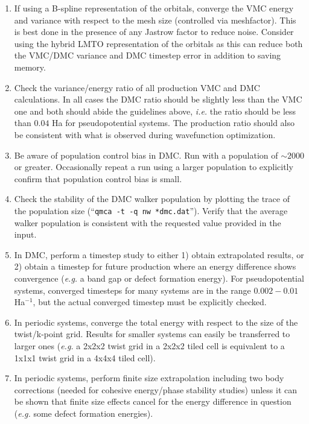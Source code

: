 \begin{enumerate}
  \item{If using a B-spline representation of the orbitals, converge 
    the VMC energy and variance with respect to the mesh size (controlled 
    via meshfactor).  This is best done in the presence of any 
    Jastrow factor to reduce noise.  Consider using the hybrid LMTO 
    representation of the orbitals as this can reduce both the VMC/DMC 
    variance and DMC timestep error in addition to saving memory.}

  \item{Check the variance/energy ratio of all production VMC and DMC 
    calculations.  In all cases the DMC ratio should be slightly 
    less than the VMC one and both should abide the guidelines above, 
    \emph{i.e.} the ratio should be less than $0.04$ Ha for 
    pseudopotential systems.  The production ratio should also be 
    consistent with what is observed during wavefunction optimization.}

  \item{Be aware of population control bias in DMC.  Run with a 
    population of $\sim 2000$ or greater.  Occasionally repeat a run 
    using a larger population to explicitly confirm that population 
    control bias is small.}

  \item{Check the stability of the DMC walker population by plotting 
    the trace of the population size (``\texttt{qmca -t -q nw *dmc.dat}'').  
    Verify that the average walker population is consistent with 
    the requested value provided in the input.}

  \item{In DMC, perform a timestep study to either 1) obtain 
    extrapolated results, or 2) obtain a timestep for future 
    production where an energy difference shows convergence 
    (\emph{e.g.} a band gap or defect formation energy).  For 
    pseudopotential systems, converged timesteps for many systems 
    are in the range $0.002-0.01$ Ha$^{-1}$, but the actual converged 
    timestep must be explicitly checked.}

  \item{In periodic systems, converge the total energy with respect to 
    the size of the twist/k-point grid.  Results for smaller systems 
    can easily be transferred to larger ones (\emph{e.g.} a 2x2x2 twist 
    grid in a 2x2x2 tiled cell is equivalent to a 1x1x1 twist grid in a 
    4x4x4 tiled cell)}.

  \item{In periodic systems, perform finite size extrapolation 
    including two body corrections (needed for cohesive energy/phase 
    stability studies) unless it can be shown that finite size effects 
    cancel for the energy difference in question (\emph{e.g.} some 
    defect formation energies).}

\end{enumerate}


